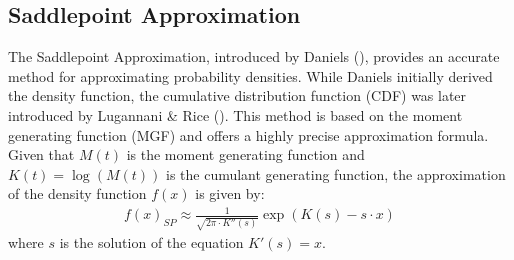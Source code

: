 \subsection{Saddlepoint Approximation}

The Saddlepoint Approximation, introduced by Daniels (\citeyear{danielsSaddlepointApproximationsStatistics1954}), provides an accurate method for approximating probability densities. While Daniels initially derived the density function, the cumulative distribution function (CDF) was later introduced by Lugannani & Rice (\citeyear{lugannaniSaddlePointApproximation1980}). This method is based on the moment generating function (MGF) and offers a highly precise approximation formula. Given that $M(t)$ is the moment generating function and $K(t) = \log(M(t))$ is the cumulant generating function, the approximation of the density function $f(x)$ is given by:
\begin{align}
    \label{eq:sp_approximation}
    f(x)_{SP} \approx \frac{1}{\sqrt{2\pi\cdot K''(s)}}\exp(K(s) - s\cdot x)
\end{align}
where $s$ is the solution of the equation $K'(s) = x$.

